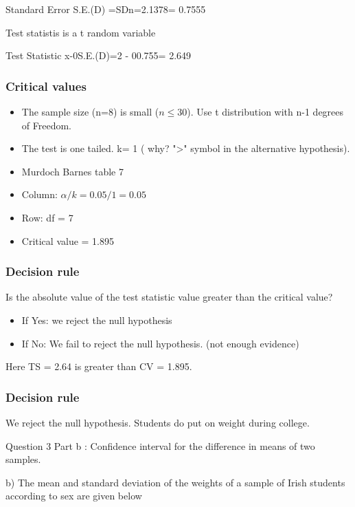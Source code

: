 \documentclass[12pt]{report}
\begin{document}
{Standard Error		S.E.(D) =SDn=2.1378= 0.7555

Test statistis is a t random variable

Test Statistic		x-0S.E.(D)=2 - 00.755= 2.649


\subsubsection{Critical values}

\begin{itemize}
\item The sample size (n=8) is small ($n \leq 30$). Use t distribution with n-1 degrees of Freedom.
\item The test is one tailed.  k= 1  ( why?  ">" symbol in the alternative hypothesis).
\item Murdoch Barnes table 7
\item Column:  $\alpha/k = 0.05/1= 0.05$
\item Row: df = 7
\item Critical value =  1.895    
\end{itemize}
\subsubsection{Decision rule}

\begin{framed}
\noindent Is the absolute value of the test statistic value greater than the critical value?
\begin{itemize}
\item If Yes: we reject the null hypothesis

\item If No: We fail to reject the null hypothesis. (not enough evidence)
\end{itemize}
\end{framed}

Here TS = 2.64  is greater than CV = 1.895.

\subsubsection{Decision rule}
We reject the null hypothesis. Students do put on weight during college. 

\newpage
Question 3 Part b : Confidence interval for the difference in means of two samples.

b) The mean and standard deviation of the weights of a sample of Irish students according to sex are given below


}
\end{document}
